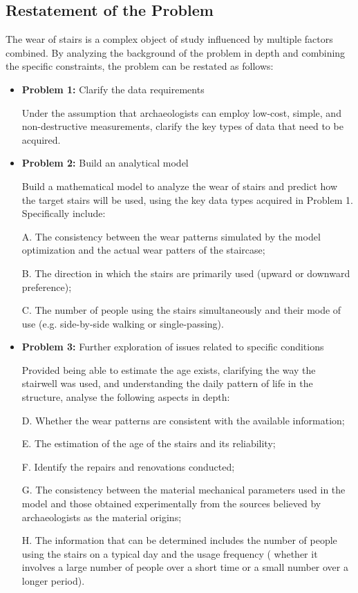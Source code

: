 \documentclass{mcmthesis}
\begin{document}
\subsection{Restatement of the Problem}
The wear of stairs is a complex object of study influenced by multiple factors combined. By analyzing the background of the problem in depth and combining the specific constraints, the problem can be restated as follows:
\begin{itemize}
\item \textbf{Problem 1:}
Clarify the data requirements

Under the assumption that archaeologists can employ low-cost, simple, and non-destructive measurements, clarify the key types of data that need to be acquired.

\item \textbf{Problem 2:}
Build an analytical model

Build a mathematical model to analyze the wear of stairs and predict how the target stairs will be used, using the key data types acquired in Problem 1. Specifically include:
\hspace{2em} %
\begin{flushleft}
A. The consistency between the wear patterns simulated by the model optimization and the actual wear patters of the staircase;

B. The direction in which the stairs are primarily used (upward or downward preference);

C. The number of people using the stairs simultaneously and their mode of use (e.g. side-by-side walking or single-passing).

\end{flushleft}

\item \textbf{Problem 3:}
Further exploration of issues related to specific conditions

Provided being able to estimate the age exists, clarifying the way the stairwell was used, and understanding the daily pattern of life in the structure, analyse the following aspects in depth:

\hspace{2em} %
\begin{flushleft}
  
  D. Whether the wear patterns are consistent with the available information; 

  E. The estimation of the age of the stairs and its reliability;

  F. Identify the repairs and renovations conducted;

  G. The consistency between the material mechanical parameters used in the model and those obtained experimentally from the sources believed by archaeologists as the material origins;

  H. The information that can be determined includes the number of people using the stairs on a typical day and the usage frequency ( whether it involves a large number of people over a short time or a small number over a longer period).

\end{flushleft}
\end{itemize}
\end{document}
